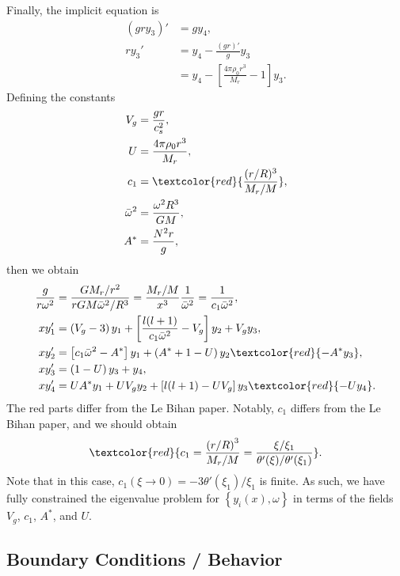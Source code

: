 \documentclass[11pt,
        usenames, %
        twocolumn,
        landscape,
        dvipsnames %
    ]{article}
\newcommand*{\p}[1]{\left(#1\right)}
\newcommand*{\s}[1]{\left[#1\right]}
\newcommand*{\z}[1]{\left\{#1\right\}}
\begin{document}
Finally, the implicit equation is
\begin{align}
    (gry_3)' &= gy_4,\nonumber\\
    ry_3' &= y_4 - \frac{(gr)'}{g}y_3\nonumber\\
        &= y_4 - \s{\frac{4\pi \rho_0 r^3}{M_r} - 1}y_3.
\end{align}
Defining the constants
\begin{align}
    V_g &= \frac{gr}{c_s^2},\\
    U &= \frac{4\pi \rho_0 r^3}{M_r},\\
    c_1 &= \textcolor{red}{\frac{(r / R)^3}{M_r / M}},\\
    \bar{\omega}^2 &= \frac{\omega^2R^3}{GM},\\
    A^* &= \frac{N^2r}{g},
\end{align}
then we obtain
\begin{align}
    \frac{g}{r\omega^2} &= \frac{GM_r / r^2}{rGM\bar{\omega}^2/R^3}
        = \frac{M_r / M}{x^3}\frac{1}{\bar{\omega}^2}
        = \frac{1}{c_1\bar{\omega}^2},\nonumber\\
    xy_1' &= \p{V_g - 3}y_1 +
        \s{\frac{l(l+1)}{c_1\bar{\omega}^2}
            - V_g}y_2
        + V_gy_3,\\
    xy_2' &= \s{c_1\bar{\omega}^2 - A^*}y_1
        + \p{A^* + 1 - U}y_2
        \textcolor{red}{- A^* y_3},\\
    xy_3' &= \p{1 - U}y_3 + y_4,\\
    xy_4' &= UA^*y_1
        + UV_gy_2
        + \s{l(l+1) - UV_g}y_3
        \textcolor{red}{- Uy_4}.
\end{align}
The red parts differ from the Le Bihan paper. Notably, $c_1$ differs from the Le
Bihan paper, and we should obtain
\begin{equation}
    \textcolor{red}{c_1 = \frac{\p{r / R}^3}{M_r / M}
        = \frac{\xi / \xi_1}{\theta'(\xi) / \theta'(\xi_1)}}.
\end{equation}
Note that in this case, $c_1(\xi \to 0) = -3\theta'(\xi_1) / \xi_1$ is finite.
As such, we have fully constrained the eigenvalue problem for $\z{y_i(x),
\omega}$ in terms of the fields $V_g$, $c_1$, $A^*$, and $U$.

\subsection{Boundary Conditions / Behavior}
\end{document}
